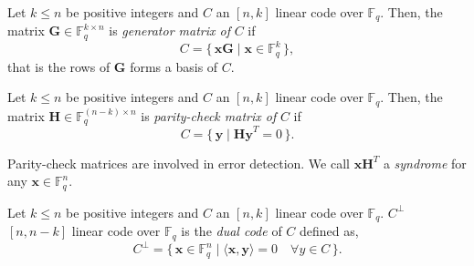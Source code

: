 \begin{definition}
Let $k \leq n$ be positive integers and $C$ an $[n, k]$ linear code over $\mathbb{F}_q$. Then, the matrix $\mathbf{G} \in \mathbb{F}_q^{k \times n}$ is \textit{generator matrix of} $C$ if 
\[
C = 
\{\, \mathbf{xG} \mid \mathbf{x} \in \mathbb{F}_q^k\,\},
\]
that is the rows of $\mathbf{G}$ forms a basis of $C$.
\end{definition}

\begin{definition}
Let $k \leq n$ be positive integers and $C$ an $[n, k]$ linear code over $\mathbb{F}_q$. Then, the matrix $\mathbf{H} \in \mathbb{F}_q^{(n-k) \times n}$ is \textit{parity-check matrix of} $C$ if 
\[
C = 
\{\, \mathbf{y} \mid \mathbf{Hy}^T = 0\,\}.
\]
\end{definition}
Parity-check matrices are involved in error detection.
We call $\mathbf{xH}^T$ a \textit{syndrome} for any $\mathbf{x} \in \mathbb{F}_q^n$.

\begin{definition}
Let $k \leq n$ be positive integers and $C$ an $[n, k]$ linear code over $\mathbb{F}_q$. $C^\perp$ $[n, n-k]$ linear code over $\mathbb{F}_q$ is the \textit{dual code} of $C$ defined as,
\[
C^\perp =
\{\, \mathbf{x} \in \mathbb{F}_q^n \mid \langle \mathbf{x}, \mathbf{y} \rangle = 0 \quad \forall y \in C\,\}.
\]
\end{definition}

